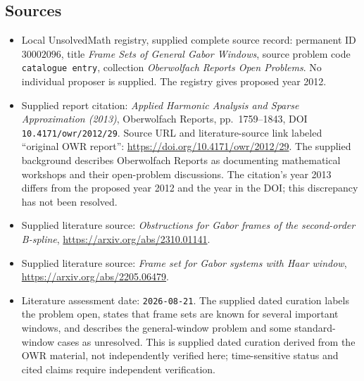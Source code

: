 \documentclass[11pt]{article}
\begin{document}
\subsection{Sources}
\begin{itemize}
\item Local UnsolvedMath registry, supplied complete source record: permanent ID \(30002096\), title \emph{Frame Sets of General Gabor Windows}, source problem code \texttt{catalogue entry}, collection \emph{Oberwolfach Reports Open Problems}. No individual proposer is supplied. The registry gives proposed year 2012.
\item Supplied report citation: \emph{Applied Harmonic Analysis and Sparse Approximation (2013)}, Oberwolfach Reports, pp.~1759--1843, DOI \texttt{10.4171/owr/2012/29}. Source URL and literature-source link labeled ``original OWR report'': \url{https://doi.org/10.4171/owr/2012/29}. The supplied background describes Oberwolfach Reports as documenting mathematical workshops and their open-problem discussions. The citation's year 2013 differs from the proposed year 2012 and the year in the DOI; this discrepancy has not been resolved.
\item Supplied literature source: \emph{Obstructions for Gabor frames of the second-order B-spline}, \url{https://arxiv.org/abs/2310.01141}.
\item Supplied literature source: \emph{Frame set for Gabor systems with Haar window}, \url{https://arxiv.org/abs/2205.06479}.
\item Literature assessment date: \texttt{2026-08-21}. The supplied dated curation labels the problem open, states that frame sets are known for several important windows, and describes the general-window problem and some standard-window cases as unresolved. This is supplied dated curation derived from the OWR material, not independently verified here; time-sensitive status and cited claims require independent verification.
\end{itemize}
\end{document}
